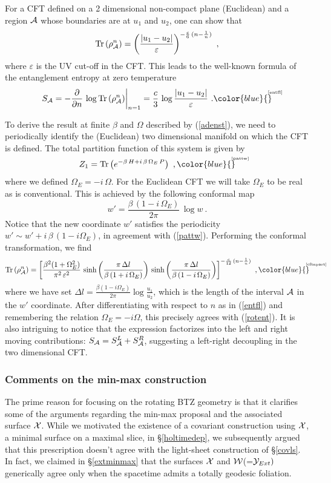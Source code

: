 \documentclass[12pt]{article}
\newcommand{\be}{\begin{equation}}
\newcommand{\ee}{\end{equation}}
\def\sec#1{\S \;\ref{#1}}
\def\req#1{(\ref{#1})}
\def\({\left (}
\def\){\right )}
\def\veps{\varepsilon}
\def\p{\partial}
\def\D{\Delta}
\def\CA{{\cal A}}
\def\CW{{\cal W}}
\def\CX{{\cal X}}
\def\CY{{\cal Y}}
\def\p{\partial}
\def\f#1#2{{\frac{#1}{#2}}}
\def\f#1#2{{\frac{#1}{#2}}}
\def\p{\partial}
\def\Tr#1{{\rm Tr}\(#1\)}
\def\Label#1{\label{#1}%
{ \color{blue}{\smash{\hbox to0pt{\raise2ex\hbox{\tiny[#1]}\hss}}}}}
\def\Gms{\CW}
\def\Lms{\CY}
\def\Xms{\CX}
\def\rA{\CA}
\def\cof{{\veps}}
\def\f {\frac}
\begin{document}
For a  CFT  defined on a 2 dimensional non-compact plane (Euclidean) and a region $\rA$ whose boundaries are at  $u_1$ and $u_2$, one can show that
%
\be
\Tr{\rho^n_\rA} =\left(\f{|u_1-u_2|}{\cof}\right)^{-\f{c}{6}\,(n-\f{1}{n})}\ , \ee
%
where $\cof$ is the UV cut-off in the CFT. This leads to the well-known formula
of the entanglement entropy at zero temperature
%
\be S_\rA =-\f{\p}{\p n}\, \log \Tr{\rho^n_\rA}\biggr|_{n=1}=\f{c}{3}\, \log
\f{|u_1-u_2|}{\cof} \ .
\Label{entfl} \ee
%

To derive the result at finite $\beta$ and $\Omega$ described by \req{adenst}, we need to periodically identify the (Euclidean) two dimensional manifold on which the CFT is defined. The total partition function of this system is given by
%
\be
Z_1=\Tr{ e^{-\beta\, H+i\, \beta\,\Omega_E \, P }}\ ,
\Label{pattw} \ee
%
 where we defined $\Omega_E=-i\,\Omega$. For the Euclidean CFT we will take $\Omega_E$ to be real as is conventional. This is achieved by the following conformal map
%
\be
w'=\f{\beta\, (1-i\,\Omega_E)}{2\pi}\, \log w\ . \ee
%
Notice that the new coordinate $w'$ satisfies the periodicity $w'\sim w'+i\,\beta\,
(1-i\Omega_E)$, in agreement with \req{pattw}.  Performing the conformal transformation,  we find
%
\be
\Tr{\rho^n_\rA} =\left[\f{\beta^2(1+\Omega^2_E)}{\pi^2\, \cof^2}\, \sinh\left(\f{\pi\, \D l}{\beta\, (1+i\,\Omega_{E})}\right)
\, \sinh\left(\f{\pi\,\D l}{\beta\, (1-i\, \Omega_E)}\right)\right]^{-\f{c}{12}\,(n-\f{1}{n})} \ ,
\Label{cftnpart}
\ee
%
 where we have set $\Delta l=\f{\beta(1-i\Omega_E)}{2\pi}\log
\f{u_{1}}{u_2}$, which is the length of the interval $\rA$ in
the $w'$ coordinate. After differentiating with respect to $n$ as
in (\ref{entfl}) and remembering the relation $\Omega_E=-i\Omega$,
this precisely agrees with \req{rotent}.
It is also intriguing to notice that the expression factorizes into the left and right moving contributions: $S_\rA =S^{L}_\rA+S^{R}_\rA$, suggesting a left-right decoupling in the two dimensional CFT.

\subsubsection{Comments on the min-max construction}
The prime reason for focusing on the rotating BTZ geometry is that
it clarifies some of the arguments regarding the min-max proposal
and the associated surface $\Xms$. While we motivated the existence
of a covariant construction using $\Xms$, a minimal surface on a
maximal slice, in \sec{holtimedep}, we subsequently argued that this
prescription doesn't agree with the light-sheet construction of
\sec{covls}. In fact, we claimed in \sec{extminmax} that the
surfaces $\Xms$ and $\Gms$(=$\Lms_{Ext})$ generically agree only
when the spacetime admits a totally geodesic foliation.
\end{document}
